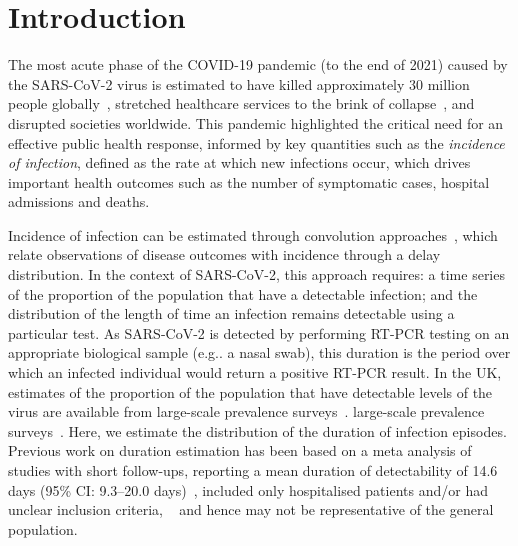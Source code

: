 \documentclass[12pt]{article}
\makeatletter
\DeclareRobustCommand\onedot{\futurelet\@let@token\@onedot}
\def\@onedot{\ifx\@let@token.\else.\null\fi\xspace}
\def\eg{e.g\onedot} \def\Eg{{E.g}\onedot}
\makeatother
\begin{document}

\newpage
{} %
\section{Introduction} \label{sec:intro}

The most acute phase of the COVID-19 pandemic (to the end of 2021) caused by the SARS-CoV-2 virus is estimated to have killed approximately 30 million people globally~\citep{whoCOVIDExcess}, stretched healthcare services to the brink of collapse~\citep{fongNHS}, and disrupted societies worldwide.
This pandemic highlighted the critical need for an effective public health response, informed by key quantities such as the \emph{incidence of infection}, defined as the rate at which new infections occur, which drives important health outcomes such as the number of symptomatic cases, hospital admissions and deaths. 

Incidence of infection can be estimated through convolution approaches~\citep[e.g.][]{brookmeyerBackcalculation},  which relate observations of disease outcomes with incidence through a delay distribution.
In the context of SARS-CoV-2, this approach requires: a time series of the proportion of the population that have a detectable infection; and the distribution of the length of time an infection remains detectable using a particular test.
As SARS-CoV-2 is detected by performing RT-PCR testing on an appropriate biological sample (\eg a nasal swab), this duration is the period over which an infected individual would return a positive RT-PCR result.
In the UK, estimates of the proportion of the population that have detectable levels of the virus are available from
large-scale prevalence surveys~\citep{cisMethodsONS,rileyREACT}.
large-scale prevalence surveys~\citep{cisMethodsONS,rileyREACT}.
Here, we estimate the distribution of the duration of infection episodes.
Previous work on duration estimation has been based on a meta analysis of studies with short follow-ups, reporting a mean duration of detectability of 14.6 days (95\% CI: 9.3--20.0 days)~\citep{cevikShedding}, included only hospitalised patients and/or had unclear inclusion criteria, ~\citep{ealesCharacterising,hellewellPCRSensitivity} and hence may not be representative of the general population.
\end{document}
